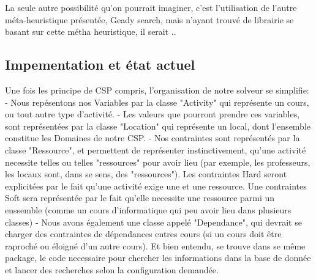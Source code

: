 La seule autre possibilité qu'on pourrait imaginer, c'est l'utilisation de l'autre méta-heuristique présentée, Geady search, mais n'ayant trouvé de librairie se basant sur cette métha heuristique, il serait .. %


\subsection{Impementation et état actuel}
Une fois les principe de CSP compris, l'organisation de notre solveur se simplifie: 
- Nous repésentons nos Variables par la classe "Activity" qui représente un cours, ou tout autre type d'activité.\newline
- Les valeurs que pourront prendre ces variables, sont représentées par la classe "Location" qui représente un local, dont l'ensemble constitue les Domaines de notre CSP.\newline
- Nos contraintes sont représentés par la classe "Ressource", et permettent de représenter instinctivement, qu'une activité necessite telles ou telles "ressources" pour avoir lieu (par exemple, les professeurs, les locaux sont, dans se sens, des "ressources"). Les contraintes Hard seront explicitées par le fait qu'une activité exige une et une ressource. Une contraintes Soft sera représentée par le fait qu'elle necessite une ressource parmi un enssemble (comme un cours d'informatique qui peu avoir lieu dans plusieurs classes) \newline
- Nous avons également une classe appelé "Dependance", qui devrait se charger des contraintes de dépendances entres cours (si un cours doit être raproché ou éloigné d'un autre cours). \newline
Et bien entendu, se trouve dans se même package, le code necessaire pour chercher les informations dans la base de donnée et lancer des recherches selon la configuration demandée.

\indent

